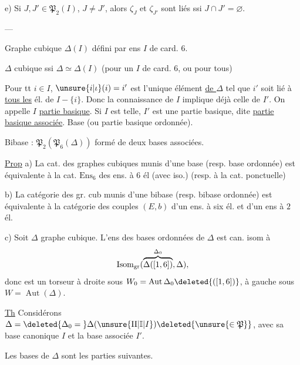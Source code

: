e) Si $J,J'\in\mathfrak P_2(I)$, $J\ne J'$, alors $\zeta_J$ et $\zeta_{J'}$ sont liés ssi $J\cap J'=\varnothing$.

\centerline{---}

Graphe cubique $\Delta(I)$ défini par ens $I$ de card. $6$.

$\Delta$ cubique ssi $\Delta\simeq\Delta(I)$ (pour un $I$ de card. $6$, ou pour tous)

Pour tt $i\in I$, $\unsure{i|\iota}(i)=i'$ est l'unique élément \uline{de $\Delta$} tel que $i'$ soit lié à \uline{tous les} él. de $I-\{i\}$. Donc la connaissance de $I$ implique déjà celle de $I'$. On appelle $I$ \uline{partie basique}. Si $I$ est telle, $I'$ est une partie basique, dite \uline{partie basique associée}. Base (ou partie basique ordonnée).


Bibase :   $\mathfrak P_2(\mathfrak P_6(\Delta))$ formé de deux  bases associées.

\uline{Prop} a) La cat.  des graphes cubiques munis d'une base (resp. base ordonnée) est équivalente  à la cat. $\mathrm{Ens}_6$ des ens. à $6$ él (avec iso.) (resp. à la cat. ponctuelle)

b) La catégorie des gr. cub munis d'une bibase (resp. bibase ordonnée) est  équivalente à la catégorie  des couples $(E,b)$ d'un ens. à six él. et d'un ens à $2$ él.

c) Soit $\Delta$ graphe cubique. L'ens des bases ordonnées de $\Delta$ est can. isom à
\[
\operatorname{Isom}_{\rm gr}(\overbrace{\Delta([1,6])}^{\Delta_0},\Delta),
\]
donc est un torseur à droite sous $W_0=\operatorname{Aut}\Delta_0\deleted{([1,6])}$, à gauche sous $W=\operatorname{Aut}(\Delta)$.

\uline{Th} Considérons $\Delta=\deleted{\Delta_0={}}\Delta(\unsure{\mathrm{II}|\mathbb I|I})\deleted{\unsure{\in\mathfrak P}}$,   avec sa base canonique  $I$ et la base associée $I'$.

Les bases de $\Delta$ sont les parties  suivantes.

